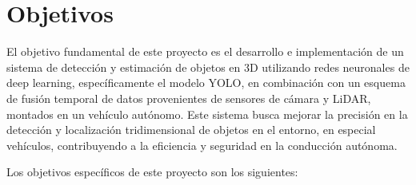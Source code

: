 \section{Objetivos}
\label{sec:objetivos-y-campo}


El objetivo fundamental de este proyecto es el desarrollo e implementación de un sistema de detección y estimación de objetos en 3D utilizando redes neuronales de deep learning, específicamente el modelo YOLO, en combinación con un esquema de fusión temporal de datos provenientes de sensores de cámara y LiDAR, montados en un vehículo autónomo. Este sistema busca mejorar la precisión en la detección y localización tridimensional de objetos en el entorno, en especial vehículos, contribuyendo a la eficiencia y seguridad en la conducción autónoma.


Los objetivos específicos de este proyecto son los siguientes:
